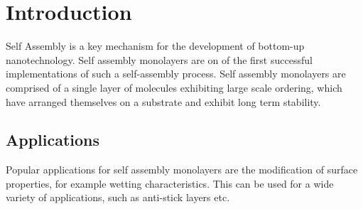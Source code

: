 \section{Introduction}

Self Assembly is a key mechanism for the development of bottom-up nanotechnology. Self assembly monolayers are on of the first successful implementations of such a self-assembly process. Self assembly monolayers are comprised of a single layer of molecules exhibiting large scale ordering, which have arranged themselves on a substrate and exhibit long term stability.

\subsection{Applications}

Popular applications for self assembly monolayers are the modification of surface properties, for example wetting characteristics. This can be used for a wide variety of applications, such as anti-stick layers etc.
